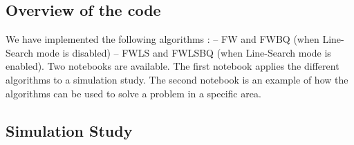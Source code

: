 \subsection{Overview of the code}

We have implemented the following algorithms : -- FW and FWBQ (when Line-Search mode is disabled) -- FWLS and FWLSBQ (when Line-Search mode is enabled). Two notebooks are available. The first notebook applies the different algorithms to a simulation study. The second notebook is an example of how the algorithms can be used to solve a problem in a specific area.

\subsection{Simulation Study}

